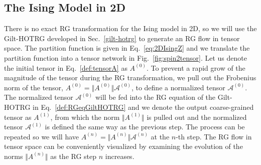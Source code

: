 \documentclass[aps,prb,reprint,superscriptaddress]{revtex4-2}
\begin{document}
\subsection{The Ising Model in 2D\label{benchmark:2DIsing}}
There is no exact RG transformation for the Ising model in 2D, so we will
use the Gilt-HOTRG developed in Sec.~\ref{gilt-hotrg} to generate an RG flow
in tensor space. The partition function is given in
Eq.~\eqref{eq:2DIsingZ} and we translate the partition function into
a tensor network in Fig.~\ref{fig:spin2tensor}. Let us denote the
initial tensor in Eq.~\eqref{def:tensorA} as $A^{(0)}$. To prevent a
rapid grow of the magnitude of the tensor during the RG transformation, we
pull out the Frobenius norm of the tensor, $A^{(0)} = \Vert
A^{(0)}\Vert \mathcal{A}^{(0)}$, to define a normalized tensor
$\mathcal{A}^{(0)}$. The normalized tensor $\mathcal{A}^{(0)}$ will be
fed into the RG equation of the Gilt-HOTRG in Eq.~\eqref{def:RGeqGiltHOTRG}
and we denote the output coarse-grained tensor as $A^{(1)}$, from which
the norm $\Vert A^{(1)}\Vert$ is pulled out and the normalized tensor
$\mathcal{A}^{(1)}$ is defined the same way as the previous step. The
process can be repeated so we will have $A^{(n)} = \Vert A^{(n)}\Vert
\mathcal{A}^{(n)}$ at the $n$-th step. The RG flow in tensor space can
be conveniently visualized by examining the evolution of the norms
$\Vert A^{(n)}\Vert$ as the RG step $n$ increases.
\end{document}
